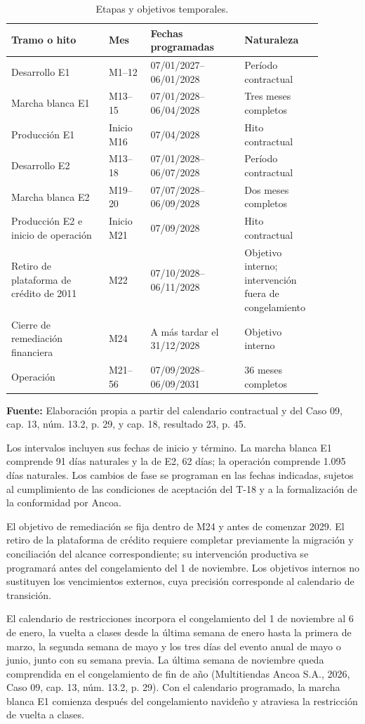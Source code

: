 \documentclass[11pt]{article}
\begin{document}
\begin{longtable}{p{0.29\linewidth}p{0.12\linewidth}p{0.27\linewidth}p{0.20\linewidth}}
\caption{Etapas y objetivos temporales.}\label{tab:7-4}\\
\toprule
\textbf{Tramo o hito} & \textbf{Mes} & \textbf{Fechas programadas} & \textbf{Naturaleza} \\
\midrule
\endhead
\bottomrule
\endlastfoot
Desarrollo E1 & M1--12 & 07/01/2027--06/01/2028 & Período contractual \\
Marcha blanca E1 & M13--15 & 07/01/2028--06/04/2028 & Tres meses completos \\
Producción E1 & Inicio M16 & 07/04/2028 & Hito contractual \\
Desarrollo E2 & M13--18 & 07/01/2028--06/07/2028 & Período contractual \\
Marcha blanca E2 & M19--20 & 07/07/2028--06/09/2028 & Dos meses completos \\
Producción E2 e inicio de operación & Inicio M21 & 07/09/2028 & Hito contractual \\
Retiro de plataforma de crédito de 2011 & M22 & 07/10/2028--06/11/2028 & Objetivo interno; intervención fuera de congelamiento \\
Cierre de remediación financiera & M24 & A más tardar el 31/12/2028 & Objetivo interno \\
Operación & M21--56 & 07/09/2028--06/09/2031 & 36 meses completos \\
\end{longtable}
\textbf{Fuente:} Elaboración propia a partir del calendario contractual y del Caso 09, cap. 13, núm. 13.2, p. 29, y cap. 18, resultado 23, p. 45.

Los intervalos incluyen sus fechas de inicio y término. La marcha blanca E1 comprende 91 días naturales y la de E2, 62 días; la operación comprende 1.095 días naturales. Los cambios de fase se programan en las fechas indicadas, sujetos al cumplimiento de las condiciones de aceptación del T-18 y a la formalización de la conformidad por Ancoa.

El objetivo de remediación se fija dentro de M24 y antes de comenzar 2029. El retiro de la plataforma de crédito requiere completar previamente la migración y conciliación del alcance correspondiente; su intervención productiva se programará antes del congelamiento del 1 de noviembre. Los objetivos internos no sustituyen los vencimientos externos, cuya precisión corresponde al calendario de transición.

El calendario de restricciones incorpora el congelamiento del 1 de noviembre al 6 de enero, la vuelta a clases desde la última semana de enero hasta la primera de marzo, la segunda semana de mayo y los tres días del evento anual de mayo o junio, junto con su semana previa. La última semana de noviembre queda comprendida en el congelamiento de fin de año (Multitiendas Ancoa S.A., 2026, Caso 09, cap. 13, núm. 13.2, p. 29). Con el calendario programado, la marcha blanca E1 comienza después del congelamiento navideño y atraviesa la restricción de vuelta a clases.
\end{document}
